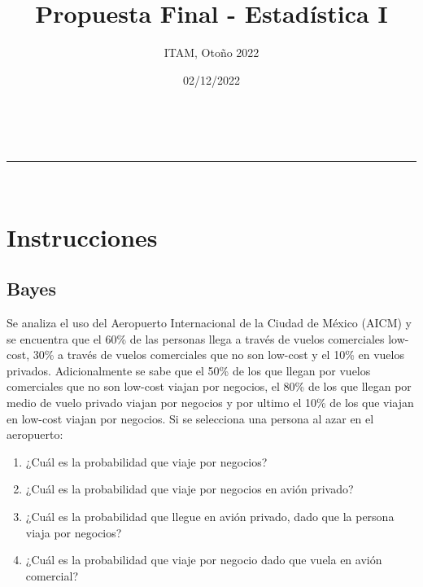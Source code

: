 \documentclass[addpoints]{exam}
\makeatletter
\newcommand{\linia}{\rule{\linewidth}{0.5pt}}
\theoremstyle{mytheor}
\renewcommand{\maketitle}{
    \begin{center}
    \vspace{2ex}
    {\huge \textsc{\@title}}
    \vspace{1ex}
    \\
    \linia\\
    \@author \hfill \@date
    \vspace{4ex}
    \end{center}
  }
\makeatother
\begin{document}
  
  \title{Propuesta Final - Estadística I}
  
  \author{ITAM, Otoño 2022}
  
  \date{02/12/2022}
  
  \maketitle
  
  \section*{Instrucciones}
  
\vspace{10pt}
  
  
  \begin{questions}
  
  \section*{Bayes}
\question Se analiza el uso del Aeropuerto Internacional de la Ciudad de México (AICM) y se encuentra que el 60\% de las personas llega a través de vuelos comerciales low-cost, 30\% a través de vuelos comerciales que no son low-cost y el 10\% en vuelos privados. Adicionalmente se sabe que el 50\% de los que llegan por vuelos comerciales que no son low-cost viajan por negocios, el 80\% de los que llegan por medio de vuelo privado viajan por negocios y por ultimo el 10\% de los que viajan en low-cost viajan por negocios.  Si se selecciona una persona al azar en el aeropuerto:
\begin{enumerate}
\item ¿Cuál es la probabilidad que viaje por negocios?
\item ¿Cuál es la probabilidad que viaje por negocios en avión privado?
\item ¿Cuál es la probabilidad que llegue en avión privado, dado que la persona viaja por negocios?
\item ¿Cuál es la probabilidad que viaje por negocio dado que vuela en avión comercial?
\end{enumerate}


\end{questions}
\end{document}
